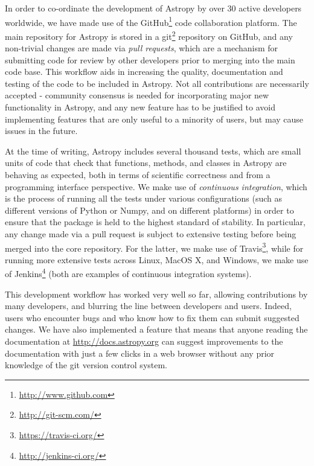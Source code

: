 \documentclass[traditabstract]{aa}
\begin{document}
\label{sec:workflow}




In order to co-ordinate the development of Astropy by over 30 active developers
worldwide, we have made use of the GitHub\footnote{\url{http://www.github.com}}
code collaboration platform. The main repository for Astropy is stored in a
git\footnote{\url{http://git-scm.com/}} repository on GitHub, and any
non-trivial changes are made via \textit{pull requests}, which are a mechanism
for submitting code for review by other developers prior to merging into the
main code base. This workflow aids in increasing the quality, documentation and
testing of the code to be included in Astropy. Not all contributions are
necessarily accepted - community consensus is needed for incorporating major
new functionality in Astropy, and any new feature has to be justified to avoid
implementing features that are only useful to a minority of users, but may
cause issues in the future.

At the time of writing, Astropy includes several thousand tests, which are
small units of code that check that functions, methods, and classes in Astropy
are behaving as expected, both in terms of scientific correctness and from a
programming interface perspective. We make use of \textit{continuous
integration}, which is the process of running all the tests under various
configurations (such as different versions of Python or Numpy, and on different
platforms) in order to ensure that the package is held to the highest standard
of stability. In particular, any change made via a pull request is subject to
extensive testing before being merged into the core repository. For the latter,
we make use of Travis\footnote{\url{https://travis-ci.org/}}, while for running
more extensive tests across Linux, MacOS X, and Windows, we make use of
Jenkins\footnote{\url{http://jenkins-ci.org/}} (both are examples of continuous
integration systems).

This development workflow has worked very well so far, allowing contributions
by many developers, and blurring the line between developers and users. Indeed,
users who encounter bugs and who know how to fix them can submit suggested
changes. We have also implemented a feature that means that anyone reading the
documentation at \url{http://docs.astropy.org} can suggest improvements to the
documentation with just a few clicks in a web browser without any prior
knowledge of the git version control system.
\end{document}
